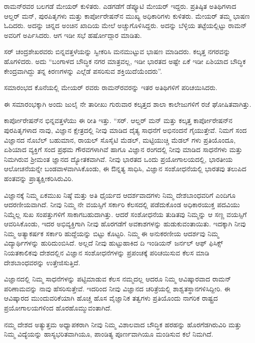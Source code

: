 ರಾಮನ್‍ರವರ ಬಲಗಡೆ ಮೇಯರ್ ಕುಳಿತರು. ಎಡಗಡೆಗೆ ಡೆಪ್ಯೂಟಿ ಮೇಯರ್ ಇದ್ದರು. ಪ್ರತಿಷ್ಠಿತ ಅತಿಥಿಗಳಾದ ಆಲ್ಡರ್ ಮನ್, ಪುರಪಿತೃಗಳು ಮತ್ತು ಕಾರ್ಪೋರೇಷನ್‍ನ ಮುಖ್ಯ ಅಧಿಕಾರಿಗಳು ಕುಳಿತರು. ಮೇಯರ್ ತಮ್ಮ ಭಾಷಣ ಓದಿದರು. ಅದನ್ನು ಚಿನ್ನದ ಅಂಚಿನ ಖಾದಿಯ ಮೇಲೆ ಅಚ್ಚುಗೊಳಿಸಿದ್ದರು. ಅದನ್ನು ಬೆಳ್ಳಿಯ ತಟ್ಟೆಯಲ್ಲಿಟ್ಟು ರಾಮನ್ ಅವರಿಗೆ ಅರ್ಪಿಸಿದರು. ಆಗ ಇಡೀ ಸಭೆ ಹರ್ಷೋದ್ಗಾರ ಮಾಡಿತು.

ಸರ್ ಚಂದ್ರಶೇಖರವರು ಬಿನ್ನವತ್ತಳೆಯನ್ನು ಸ್ವೀಕರಿಸಿ ಮನಮುಟ್ಟುವ ಭಾಷಣ ಮಾಡಿದರು. ಕಲ್ಕತ್ತ ನಗರವನ್ನು ಹೊಗಳಿದರು. ಅದು “ಬಂಗಾಳದ ಬೌದ್ಧಿಕ ನಗರ ಮಾತ್ರವಲ್ಲ, ಇಡೀ ಭಾರತದ ಅಷ್ಟೇ ಏಕೆ ಇಡೀ ಏಶಿಯಾದ ಬೌದ್ಧಿಕ ಕೇಂದ್ರವಾಗಿದ್ದು ತನ್ನ ಕಿರಣಗಳನ್ನು ಎಲ್ಲೆಡೆ ಪಸರಿಸುವ ಶಕ್ತಿಯಿದೆಯೆಂದರು”.

ಸಮಾರಂಭದ ಕೊನೆಯಲ್ಲಿ ಮೇಯರ್ ರವರು ರಾಮನ್‍ರವರನ್ನು ಇತರ ಅತಿಥಿಗಳಿಗೆ ಪರಿಚಯಿಸಿದರು.

ಈ ಸಮಾರಂಭಕ್ಕಾಗಿ ಅಂದು ಜುಲೈ ನೇ ತಾರೀಖು ಗುರುವಾರ ಕಲ್ಕತ್ತದ ಶಾಲಾ ಕಾಲೇಜುಗಳಿಗೆ ರಜೆ ಘೋಷಿತವಾಗಿತ್ತು.

ಕಾರ್ಪೋರೇಷನ್‍ನ ಭಿನ್ನವತ್ತಳೆಯು ಈ ರೀತಿ ಇತ್ತು. “ಸರ್. ಆಲ್ಡರ್ ಮನ್ ಮತ್ತು ಕಲ್ಕತ್ತ ಕಾರ್ಪೋರೇಷನ್‍ನ ಪುರಪಿತೃಗಳಾದ ನಾವು, ವಿಜ್ಞಾನ ಕ್ಷೇತ್ರದಲ್ಲಿ ನೀವು ಮಾಡಿದ ದೈತ್ಯ ಸಾಧನೆಗೆ ಅಭಿನಂದನೆ ಗೈಯುತ್ತೇವೆ. ನಿಮಗೆ ಸಂದ ವಿಜ್ಞಾನದ ನೊಬೆಲ್ ಬಹುಮಾನ, ರಾಯಲ್ ಸೊಸೈಟಿ ಮೆಡಲ್, ಮಟ್ಟಿಯುಚ್ಚಿ ಮೆಡಲ್ ಗಳು ಪ್ರತಿಯೊಂದೂ, ಏಶಿಯಾದ ವ್ಯಕ್ತಿಗೆ ಸಂದ ಪ್ರಥಮ ಗೌರವಗಳಾಗಿವೆ ಹಾಗೂ ವಿಜ್ಞಾನ ರಂಗದಲ್ಲಿ ನೀವು ಮಾಡಿದ ಸಾಧನೆಗಳು ಮತ್ತು ನಿಮಗಿರುವ ಶ‍್ರೀಮಂತ ಜ್ಞಾನದ ದ್ಯೋತಕವಾಗಿವೆ. ನೀವು ಭಾರತದ ಒಂದು ಪ್ರಯೋಗಾಲಯದಲ್ಲಿ, ಭಾರತೀಯ ಆಲೋಚನೆಯನ್ನೇ ಬಂಡವಾಳವಾಗಿಸಿಕೊಂಡು, ಈ ಔನ್ನತ್ಯ ಸಾಧಿಸಿ, ವಿಜ್ಞಾನ ಸಂಶೋಧನೆಯಲ್ಲಿ ಭಾರತವು ತಲುಪಿದ ಹಂತವನ್ನು ಪ್ರಾತ್ಯಕ್ಷೀಕರಿಸಿರುವಿರಿ.

ವಿಜ್ಞಾನಕ್ಕೆ ನಿಮ್ಮ ಏಕಮುಖ ನಿಷ್ಠೆ ಮತ್ತು ಅತಿ ಧೈರ್ಯದ ಆದರ್ಶವಾದಗಳು ನಿಮ್ಮ ದೇಶಬಾಂಧವರಿಗೆ ಎಂದಿಗೂ ಆದರಣೀಯವಾಗಿದೆ. ನೀವು ನಿಮ್ಮ ನೇ ವಯಸ್ಸಿಗೆ ಸರ್ಕಾರಿ ಕೆಲಸದಲ್ಲಿ ಪಡೆದುಕೊಂಡ ಅಧಿಕಾರಯುಕ್ತ ಪದವಿಯು ನಿಮ್ಮೆಲ್ಲ ಸುಖ ಸಂಪತ್ತುಗಳಿಗೆ ಸಾಕಾಗಬಹುದಾಗಿತ್ತು. ಆದರೆ ಸಂಶೋಧನೆಯ ತುಡಿತವು ನಿಮ್ಮನ್ನು ಆ ಸಣ್ಣ ವಯಸ್ಸಿಗೆ ಆವರಿಸಿಕೊಂಡು, ಇದರ ಅಭಿವ್ಯಕ್ತಿಗಾಗಿ ನೀವು ಹೊರಗಡೆಗೆ ಅವಕಾಶಗಳನ್ನು ಹುಡುಕುವಂತಾಯಿತು. ಇದಕ್ಕಾಗಿ ನೀವು ನಿಮ್ಮ ಅತ್ಯಾಕರ್ಷಕ ಸರ್ಕಾರಿ ಹುದ್ದೆಯನ್ನು ಬಿಟ್ಟು ಕೊಟ್ಟರಿ. ನಿಮ್ಮ ಈ ಅನುಕರಣೀಯ ಆದರ್ಶವು ನಿಮ್ಮ ವಿದ್ಯಾರ್ಥಿಗಳನ್ನು ಹುರಿದುಂಬಿಸಿದೆ. ಅಲ್ಲದೆ ನೀವು ಹುಟ್ಟುಹಾಕಿದ ದಿ ಇಂಡಿಯನ್ ಜರ್ನಲ್ ಆಫ್ ಫಿಸಿಕ್ಸ್ ನಿಯತಕಾಲಿಕವು ದೇಶದಲ್ಲಿನ ವಿಜ್ಞಾನ ಸಂಶೋಧನೆಗಳನ್ನು ಪ್ರಪಂಚಕ್ಕೆ ಪರಿಚಯಿಸುವ ಕೆಲಸ ಮಾಡಿ ದೇಶಬಾಂಧವರನ್ನು ಉತ್ತೇಜಿಸುತ್ತಿದೆ.

ವಿಜ್ಞಾನದಲ್ಲಿ ನಿಮ್ಮ ಸಾಧನೆಗಳನ್ನು ಪಟ್ಟಿಮಾಡುವ ಕೆಲಸ ನಮ್ಮದಲ್ಲ ಆದರೂ ನಿಮ್ಮ ಆವಿಷ್ಕಾರವಾದ ರಾಮನ್ ಪರಿಣಾಮವನ್ನು ನಾವು ಹೆಸರಿಸುತ್ತೇವೆ. ಇದರಿಂದ ನೀವು ವಿಜ್ಞಾನದ ಚರಿತ್ರೆಯಲ್ಲಿ ಶಾಶ್ವತಸ್ಥಾನಗಳಿಸಿದ್ದೀರಿ. ಈ ಆವಿಷ್ಕಾರದ ಮುಂದುವರಿಕೆಯಾಗಿ ಹೊಚ್ಚ ಹೊಸ ವೈಜ್ಞಾನಿಕ ತತ್ವಗಳು ಪ್ರತಿಯೊಂದು ನಾಗರಿಕ ರಾಷ್ಟ್ರದ ಪ್ರಯೋಗಾಲಯಗಳಿಂದ ಹೊರಹೊಮ್ಮುವಂತಾಗಿದೆ.

ನಮ್ಮ ದೇಶದ ಅತ್ಯುತ್ತಮ ಅಧ್ಯಾಪಕರಾಗಿ ನೀವು ನಿಮ್ಮ ವಿಶಾಲವಾದ ಬೌದ್ಧಿಕ ಹರಹನ್ನು ಹೊರಗೆಡಗಿರುವಿರಿ ಮತ್ತು ನಿಮ್ಮ ವಿದ್ಯೆಯನ್ನು ಹಾಸ್ಯಭರಿತವಾಗಿಯೂ, ಪಾಂಡಿತ್ಯ ಪೂರ್ಣವಾಗಿಯೂ ಮಂಡಿಸುವ ಕಲೆ ನಿಮಗಿದೆ.

